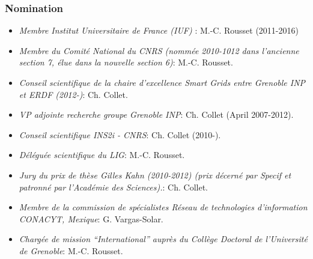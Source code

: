 \subsubsection*{Nomination}
\begin{itemize}

\setlength{\itemindent}{-0.5cm}
\setlength{\itemsep}{-0.1cm}

\item {\it Membre  Institut Universitaire de France (IUF) }: M.-C. Rousset (2011-2016)

\item {\it Membre  du Comit\'e National du CNRS (nomm\'ee 2010-1012 dans l'ancienne section 7, \'elue dans la nouvelle section 6)}: M.-C. Rousset.

\item {\it Conseil scientifique de la chaire d'excellence Smart Grids entre Grenoble INP et ERDF (2012-)}: Ch. Collet.

\item {\it VP adjointe recherche groupe Grenoble INP}: Ch. Collet (April 2007-2012).

\item {\it Conseil scientifique INS2i - CNRS}: Ch. Collet (2010-).

\item {\it D\'el\'egu\'ee scientifique du LIG}: M.-C. Rousset.

\item {\it Jury du prix de th{\`e}se Gilles Kahn (2010-2012) (prix d{\'e}cern{\'e} par Specif et patronn{\'e} par l'Acad{\'e}mie des Sciences).}: Ch. Collet.

\item {\it Membre de la commission de sp{\'e}cialistes R{\'e}seau de technologies d'information CONACYT, Mexique}: G. Vargas-Solar.

\item {\it Charg\'ee de mission ``International'' aupr\`es du Coll\`ege Doctoral de l'Universit\'e de Grenoble}: M.-C. Rousset.

 



\end{itemize}


